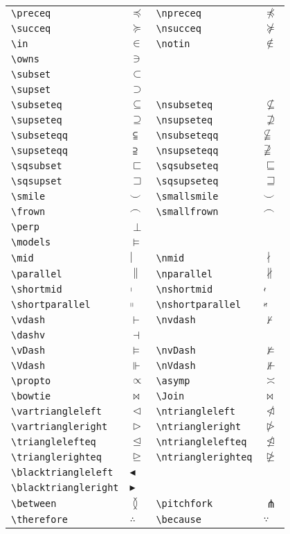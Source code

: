 \begin{tabular}{>{\centering}p{0.3\linewidth}<{\centering}>{\centering}p{0.1\linewidth}<{\centering}|>{\centering}p{0.3\linewidth}<{\centering}>{\centering}p{0.1\linewidth}<{\centering}|}
    \lstinline!\preceq! & $\preceq$ & \lstinline!\npreceq! & $\npreceq$  \tabularnewline
 \lstinline!\succeq! & $\succeq$ & \lstinline!\nsucceq! & $\nsucceq$ \tabularnewline
    \lstinline!\in! & $\in$ & \lstinline!\notin! & $\notin$ \tabularnewline
 \lstinline!\owns! & $\owns$ &  &  \tabularnewline 
    \lstinline!\subset! & $\subset$ &  &  \tabularnewline
 \lstinline!\supset! & $\supset$ &  &  \tabularnewline 
    \lstinline!\subseteq! & $\subseteq$ & \lstinline!\nsubseteq!  & $\nsubseteq$ \tabularnewline
 \lstinline!\supseteq! & $\supseteq$ & \lstinline!\nsupseteq! & $\nsupseteq$ \tabularnewline 
    \lstinline!\subseteqq!  & $\subseteqq$ & \lstinline!\nsubseteqq!  & $\nsubseteqq$ \tabularnewline
 \lstinline!\supseteqq!  & $\supseteqq$ & \lstinline!\nsupseteqq! & $\nsupseteqq$ \tabularnewline 
    \lstinline!\sqsubset! & $\sqsubset$ & \lstinline!\sqsubseteq! & $\sqsubseteq$ \tabularnewline
 \lstinline!\sqsupset! & $\sqsupset$ & \lstinline!\sqsupseteq! & $\sqsupseteq$  \tabularnewline 
    \lstinline!\smile! & $\smile$ & \lstinline!\smallsmile! & $\smallsmile$ \tabularnewline
 \lstinline!\frown! & $\frown$ & \lstinline!\smallfrown! & $\smallfrown$ \tabularnewline 
    \lstinline!\perp! & $\perp$ &  &  \tabularnewline
 \lstinline!\models! & $\models$ &  &  \tabularnewline 
    \lstinline!\mid! & $\mid$ & \lstinline!\nmid! & $\nmid$ \tabularnewline
 \lstinline!\parallel! & $\parallel$ & \lstinline!\nparallel! & $\nparallel$ \tabularnewline 
    \lstinline!\shortmid! & $\shortmid$ & \lstinline!\nshortmid! & $\nshortmid$ \tabularnewline
 \lstinline!\shortparallel! & $\shortparallel$ & \lstinline!\nshortparallel! & $\nshortparallel$ \tabularnewline 
    \lstinline!\vdash! & $\vdash$ & \lstinline!\nvdash! & $\nvdash$ \tabularnewline
 \lstinline!\dashv! & $\dashv$ &  &  \tabularnewline 
    \lstinline!\vDash!  & $\vDash$ & \lstinline!\nvDash!  & $\nvDash$ \tabularnewline
 \lstinline!\Vdash!  & $\Vdash $ & \lstinline!\nVdash! & $\nVdash$ \tabularnewline 
    \lstinline!\propto! & $\propto$ & \lstinline!\asymp! & $\asymp$ \tabularnewline
 \lstinline!\bowtie! & $\bowtie$ & \lstinline!\Join! & $\Join$ \tabularnewline 
    \lstinline!\vartriangleleft!  & $\vartriangleleft$ & \lstinline!\ntriangleleft!  & $\ntriangleleft$ \tabularnewline
 \lstinline!\vartriangleright!  & $\vartriangleright$ & \lstinline!\ntriangleright! & $\ntriangleright$ \tabularnewline 
    \lstinline!\trianglelefteq!  & $\trianglelefteq$ & \lstinline!\ntrianglelefteq!  & $\ntrianglelefteq$ \tabularnewline
 \lstinline!\trianglerighteq!  & $\trianglerighteq$ & \lstinline!\ntrianglerighteq! & $\ntrianglerighteq$ \tabularnewline 
    \lstinline!\blacktriangleleft! & $\blacktriangleleft$ &  &  \tabularnewline
 \lstinline!\blacktriangleright! & $\blacktriangleright$ &  &  \tabularnewline 
    \lstinline!\between!  & $\between$ & \lstinline!\pitchfork! & $\pitchfork$ \tabularnewline
 \lstinline!\therefore! & $\therefore$ & \lstinline!\because! & $\because$ \tabularnewline \hline
\end{tabular}
